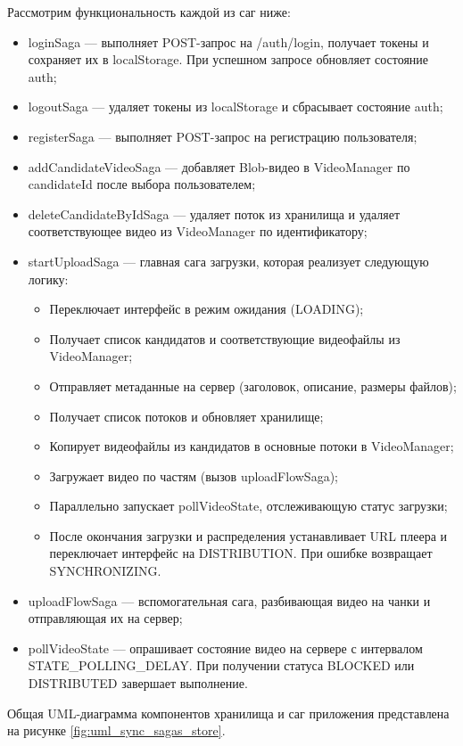 	Рассмотрим функциональность каждой из саг ниже:
	\begin{itemize}[label=$\bullet$]
		\item loginSaga — выполняет POST-запрос на /auth/login, получает токены и сохраняет их в localStorage. При успешном запросе обновляет состояние auth;
		\item logoutSaga — удаляет токены из localStorage и сбрасывает состояние auth;
		\item registerSaga — выполняет POST-запрос на регистрацию пользователя;
		\item addCandidateVideoSaga — добавляет Blob-видео в VideoManager по candidateId после выбора пользователем;
		\item deleteCandidateByIdSaga — удаляет поток из хранилища и удаляет соответствующее видео из VideoManager по идентификатору;
		\item startUploadSaga — главная сага загрузки, которая реализует следующую логику:
		\begin{itemize}[label=$\circ$]
			\item Переключает интерфейс в режим ожидания (LOADING);
			\item Получает список кандидатов и соответствующие видеофайлы из VideoManager;
			\item Отправляет метаданные на сервер (заголовок, описание, размеры файлов);
			\item Получает список потоков и обновляет хранилище;
			\item Копирует видеофайлы из кандидатов в основные потоки в VideoManager;
			\item Загружает видео по частям (вызов uploadFlowSaga);
			\item Параллельно запускает pollVideoState, отслеживающую статус загрузки;
			\item После окончания загрузки и распределения устанавливает URL плеера и переключает интерфейс на DISTRIBUTION. При ошибке возвращает SYNCHRONIZING.
		\end{itemize}
		\item uploadFlowSaga — вспомогательная сага, разбивающая видео на чанки и отправляющая их на сервер;
		\item pollVideoState — опрашивает состояние видео на сервере с интервалом STATE\_POLLING\_DELAY. При получении статуса BLOCKED или DISTRIBUTED завершает выполнение.
	\end{itemize}
	
	Общая UML-диаграмма компонентов хранилища и саг приложения представлена на рисунке \ref{fig:uml_sync_sagas_store}.
	
